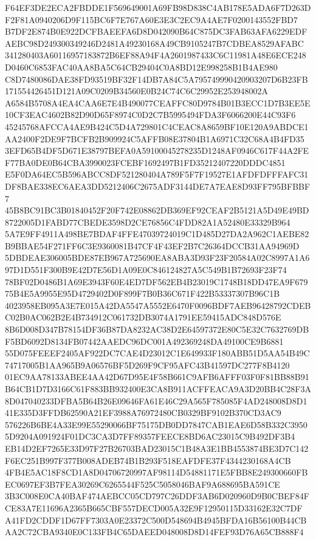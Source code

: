 \documentclass[UTF8,fontset=fandol,zihao=-4,a4paper]{ctexart}
\begin{document}
{{F64EF3DE2ECA2FBDDE1F569649001A69FB98D838C4AB178E5ADA6F7D263DF2F81A0940206D9F115BC6F7E767A60E3E3C2EC9A4AE7F0200143552FBD7
B7DF2E874B0E922DCFBAEEFA6D8D042090B64C875DC3FAB63AFA6229EDFAEBC98D249300349246D2481A49230168A49CB9105247B7CDBEA8529AFABC
341280403A60116957183872B6EF88A94F4A2601987433C6C11981A48E6ECE248D0460C6853FAC40AA8BA5C64CB29404C0A8BD12E998258B1B4AE980
C8D7480086DAE38FD93519BF32F14DB7A84C5A795749990420903207D6B23FB171554426451D121A09C0209B34560E0B24C74C6C29952E253948002A
A6584B5708A4EA4CAA6E7E4B490077CEAFFC80D9784B01B3ECC1D7B3EE5E10CF3EAC4602B82D90D65F8974C0D2C7B5995494FDA3F6066200E44C93F6
45245768AFCCA4AE9B424C5D4A729801C4CEAC8A8659BF10E120A9ABDCE1AA2400F2DE9F7BCFB2B909924C5AFFB08E37804B1A6971C32C68A4B4FD35
3EFD65B4DF5D671E38797BEFA0A59100045278235D1248AF0946C617F44A2FEF77BA0DE0B64CBA3990023FCEBF1692497B1FD35212407220DDDC4851
E5F0DA64EC5B596ABCC8DF521280404A789F5F7F19527E1AFDFDFFFAFC31DF8BAE338EC6AEA3DD5212406C2675ADF3144DE7A7EAE8D93FF795BFBBF7
45B8BC91BC3B01840452F20F742E08862DB369EF92CEAF2B5121A5D49E49BD8722005D1FABD77CBEDE3598D2CE76856C4FDD82A1A52480E33329B964
5A7E9FF4911A498BE7BDAF4FFE47039724019C1D485D27DA2A962C1AEBE82B9BBAE54F271FF6C3E9360081B47CF4F43EF2B7C26364DCCB31AA94969D
5DBDEAE306005BDE87EB967A725690EA8ABA3D93F23F20584A02C8997A1A697D1D551F300B9E42D7E56D1A09E0C846124827A5C549B1B72693F23F74
78BF02D0486B1A69E3943F60E4ED7DF562EB4B23019C1748B18DD47EA9F67975B4E5A9955E95D4729402D0F899F7B0B36C671F422B53337307B96C1B
4023958EB095A3E7E015A42DA5547A5552E6470F0096BDF7AEB96428792CDEBC02B0AC062B2E4B734912C061732DB3074A1791EE59415ADC848D576E
8B6D008D347B78154DF36B87DA8232AC38D2E64597372E80C5E32C7632769DBF5BD6092D8134FB07442AAEDC96DC001A492369248DA49100CE9B6881
55D075FEEEF2405AF922DC7CAE4D23012C1E649933F180ABB51D5AA54B49C74717005B1AA965B9A06576BF5D269F9CF95AFC43B41597DC277F8B4120
01EC9AA78133ABEE4AA42D67D95E4F58B661C9AFB6AFFF03F0F81BB88B91B64CB1D7D3166C61F883BB932400E3CA8B911ACFFEACA9A3D20BB4C28F3A
8D047040233DFBA5B64B26E09646FA61E46C29A565F785085F4AD248008D8D141E335D3FFDB62590A21EF3988A76972480CB0329BF9102B370CD3AC9
576226B6BE4A33E99E55290066BF75175DB0DD7847CAB1EAE6D58B332C39505D9204A091924F01DC3CA3D7FF89357FEECE8BD6AC23015C9B492DF3B4
EB14D2EF7265E33D97F27B26703BAD23015C1B48A3E1BB4553874BE3D7C142F6EC251B997F377B008ADEB74B1B293F518EAFDFE37F4344230168A4CB
4FB4E5AC18F8CD1A8D04706720997AF98114D54881171E5FBB8E249300660FBEC0697EF3B7FEA30269C6265544F525C5058046BAF9A688695BA591CE
3B3C008E0CA40BAF474AEBCC05CD797C26DDF3AB6D020960D9B0CBEF84FCE83A7E11696A2365B665CBF557DECD005A32E9F12950115D33162E32C7DF
A41FD2CDDF1D67FF7303A0E23372C500D548694B4945BFDA16B56100B44CBAA2C72CBA9340E0C133FB4C65DAEED048008D8D14FEF93D76A65CB888F4
}}
\end{document}
